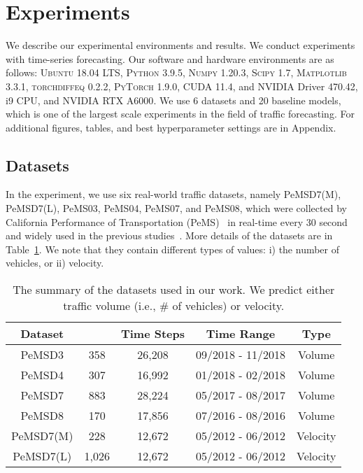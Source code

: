 \documentclass[letterpaper]{article} \usepackage{aaai22}  \usepackage{times}  \usepackage{helvet}  \usepackage{courier}  \usepackage[hyphens]{url}  \usepackage{graphicx} \urlstyle{rm} \def\UrlFont{\rm}  \usepackage{natbib}  \usepackage{caption} \DeclareCaptionStyle{ruled}{labelfont=normalfont,labelsep=colon,strut=off} \frenchspacing  \setlength{\pdfpagewidth}{8.5in}  \setlength{\pdfpageheight}{11in}  \usepackage{stfloats}
\begin{document}
\section{Experiments}
We describe our experimental environments and results. We conduct experiments with time-series forecasting. Our software and hardware environments are as follows: \textsc{Ubuntu} 18.04 LTS, \textsc{Python} 3.9.5, \textsc{Numpy} 1.20.3, \textsc{Scipy} 1.7, \textsc{Matplotlib} 3.3.1, \textsc{torchdiffeq} 0.2.2, \textsc{PyTorch} 1.9.0, \textsc{CUDA} 11.4, and \textsc{NVIDIA} Driver 470.42, i9 CPU, and \textsc{NVIDIA RTX A6000}. We use 6 datasets and 20 baseline models, which is one of the largest scale experiments in the field of traffic forecasting. For additional figures, tables, and best hyperparameter settings are in Appendix.
\subsection{Datasets}
In the experiment, we use six real-world traffic datasets, namely PeMSD7(M), PeMSD7(L), PeMS03, PeMS04, PeMS07, and PeMS08, which were collected by California Performance of Transportation (PeMS)~\cite{chen2001freeway} in real-time every 30 second and widely used in the previous studies~\cite{bing2018stgcn,guo2019astgcn,fang2021STODE,chen2021ZGCNET,song2020stsgcn}. More details of the datasets are in Table~\ref{tab:dataset}. We note that they contain different types of values: i) the number of vehicles, or ii) velocity.


\begin{table}[t]
\setlength{\tabcolsep}{2pt}
    \centering
    \small
    \begin{tabular}{ccccc}
    \hline
        Dataset     &   & Time Steps& Time Range & Type \\ \hline
        PeMSD3      & 358       & 26,208    & 09/2018 - 11/2018 & Volume \\
        PeMSD4      & 307       & 16,992    & 01/2018 - 02/2018 & Volume \\
        PeMSD7      & 883       & 28,224    & 05/2017 - 08/2017 & Volume \\ 
        PeMSD8      & 170       & 17,856    & 07/2016 - 08/2016 & Volume \\ 
        PeMSD7(M)   & 228       & 12,672    & 05/2012 - 06/2012 & Velocity\\
        PeMSD7(L)   & 1,026     & 12,672    & 05/2012 - 06/2012 & Velocity\\
    \hline
    \end{tabular}
    \caption{The summary of the datasets used in our work. We predict either traffic volume (i.e., \# of vehicles) or velocity.}
    \label{tab:dataset}
\end{table}
\end{document}

